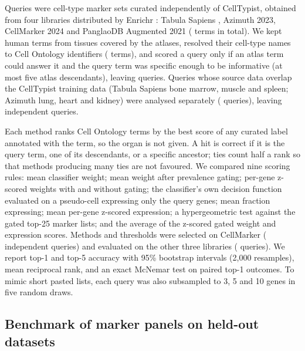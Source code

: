 \documentclass[11pt]{article}
\begin{document}
Queries were cell-type marker sets curated independently of CellTypist, obtained from four libraries distributed by Enrichr \cite{kuleshov2016}: Tabula Sapiens \cite{tabulasapiens2022}, Azimuth 2023, CellMarker 2024 and PanglaoDB Augmented 2021 (\lkTerms{} terms in total). We kept human terms from tissues covered by the atlases, resolved their cell-type names to Cell Ontology identifiers (\lkResolved{} terms), and scored a query only if an atlas term could answer it and the query term was specific enough to be informative (at most five atlas descendants), leaving \lkScored{} queries. Queries whose source data overlap the CellTypist training data (Tabula Sapiens bone marrow, muscle and spleen; Azimuth lung, heart and kidney) were analysed separately (\lkOverlap{} queries), leaving \lkIndependent{} independent queries.

Each method ranks Cell Ontology terms by the best score of any curated label annotated with the term, so the organ is not given. A hit is correct if it is the query term, one of its descendants, or a specific ancestor; ties count half a rank so that methods producing many ties are not favoured. We compared nine scoring rules: mean classifier weight; mean weight after prevalence gating; per-gene z-scored weights with and without gating; the classifier's own decision function evaluated on a pseudo-cell expressing only the query genes; mean fraction expressing; mean per-gene z-scored expression; a hypergeometric test against the gated top-25 marker lists; and the average of the z-scored gated weight and expression scores. Methods and thresholds were selected on CellMarker (\lkDev{} independent queries) and evaluated on the other three libraries (\lkTest{} queries). We report top-1 and top-5 accuracy with 95\% bootstrap intervals (2{,}000 resamples), mean reciprocal rank, and an exact McNemar test on paired top-1 outcomes. To mimic short pasted lists, each query was also subsampled to 3, 5 and 10 genes in five random draws.

\subsection{Benchmark of marker panels on held-out datasets}
\end{document}
